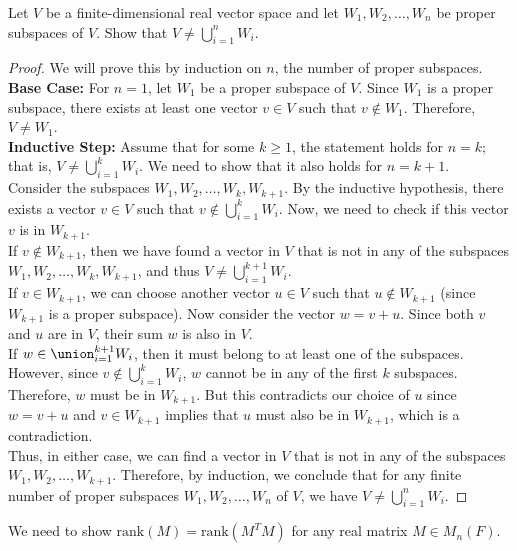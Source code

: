 \documentclass[openany]{book}
\begin{document}
\begin{exercise}
    Let $V$ be a finite-dimensional real vector space and let $W_1, W_2, \ldots, W_n$ be proper subspaces of $V$. Show that $V \neq \bigcup_{i=1}^n W_i$.
\end{exercise}
\begin{proof}
    We will prove this by induction on \( n \), the number of proper subspaces. \\
    \textbf{Base Case:} For \( n = 1 \), let \( W_1 \) be a proper subspace of \( V \). Since \( W_1 \) is a proper subspace, there exists at least one vector \( v \in V \) such that \( v \notin W_1 \). Therefore, \( V \neq W_1 \). \\
    \textbf{Inductive Step:} Assume that for some \( k \geq 1 \), the statement holds for \( n = k \); that is, \( V \neq \bigcup_{i=1}^k W_i \). We need to show that it also holds for \( n = k + 1 \). \\
    Consider the subspaces \( W_1, W_2, \ldots, W_k, W_{k+1} \). By the inductive hypothesis, there exists a vector \( v \in V \) such that \( v \notin \bigcup_{i=1}^k W_i \). Now, we need to check if this vector \( v \) is in \( W_{k+1} \). \\
    If \( v \notin W_{k+1} \), then we have found a vector in \( V \) that is not in any of the subspaces \( W_1, W_2, \ldots, W_k, W_{k+1} \), and thus \( V \neq \bigcup_{i=1}^{k+1} W_i \). \\
    If \( v \in W_{k+1} \), we can choose another vector \( u \in V \) such that \( u \notin W_{k+1} \) (since \( W_{k+1} \) is a proper subspace). Now consider the vector \( w = v + u \). Since both \( v \) and \( u \) are in \( V \), their sum \( w \) is also in \( V \). \\
    If $w \in \union_{i=1}^{k+1} W_i$, then it must belong to at least one of the subspaces. However, since \( v \notin \bigcup_{i=1}^k W_i \), $w$ cannot be in any of the first \( k \) subspaces. Therefore, $w$ must be in \( W_{k+1} \). But this contradicts our choice of \( u \) since \( w = v + u \) and \( v \in W_{k+1} \) implies that \( u \) must also be in \( W_{k+1} \), which is a contradiction. \\
    Thus, in either case, we can find a vector in \( V \) that is not in any of the subspaces \( W_1, W_2, \ldots, W_{k+1} \). Therefore, by induction, we conclude that for any finite number of proper subspaces \( W_1, W_2, \ldots, W_n \) of \( V \), we have \( V \neq \bigcup_{i=1}^n W_i \).
\end{proof}
\begin{exercise}
    We need to show $\text{rank}(M) = \text{rank}(M^T M)$ for any real matrix \( M \in M_n(F) \).
\end{exercise}
\end{document}
